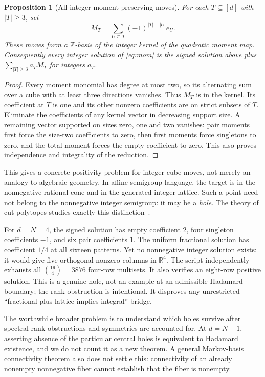 \documentclass[11pt]{article}
\newtheorem{proposition}{Proposition}[section]
\newcommand{\Z}{\mathbb Z}
\newcommand{\R}{\mathbb R}
\begin{document}
\begin{proposition}[All integer moment-preserving moves]\label{prop:moves}
For each $T\subseteq[d]$ with $|T|\ge3$, set
\[
 M_T=\sum_{U\subseteq T}(-1)^{|T|-|U|}e_U.
\]
These moves form a $\Z$-basis of the integer kernel of the quadratic
moment map. Consequently every integer solution of \eqref{eq:mom}
is the signed solution above plus $\sum_{|T|\ge3}a_TM_T$ for integers
$a_T$.
\end{proposition}
\begin{proof}
Every moment monomial has degree at most two, so its alternating sum
over a cube with at least three directions vanishes. Thus $M_T$ is in
the kernel. Its coefficient at $T$ is one and its other nonzero
coefficients are on strict subsets of $T$. Eliminate the coefficients
of any kernel vector in decreasing support size. A remaining vector
supported on sizes zero, one and two vanishes: pair moments first force
the size-two coefficients to zero, then first moments force singletons
to zero, and the total moment forces the empty coefficient to zero.
This also proves independence and integrality of the reduction.
\end{proof}

This gives a concrete positivity problem for integer cube moves, not
merely an analogy to algebraic geometry. In affine-semigroup language,
the target is in the nonnegative rational cone and in the generated
integer lattice. Such a point need not belong to the nonnegative
integer semigroup: it may be a \emph{hole}. The theory of cut polytopes
studies exactly this distinction~\cite{Ohsugi}.

For $d=N=4$, the signed solution has empty coefficient $2$, four
singleton coefficients $-1$, and six pair coefficients $1$. The
uniform fractional solution has coefficient $1/4$ at all sixteen
patterns. Yet no nonnegative integer solution exists: it would give
five orthogonal nonzero columns in $\R^4$. The script independently
exhausts all $\binom{19}{4}=3876$ four-row multisets. It also verifies
an eight-row positive solution. This is a genuine hole, not an example
at an admissible Hadamard boundary; the rank obstruction is intentional.
It disproves any unrestricted ``fractional plus lattice implies
integral'' bridge.

The worthwhile broader problem is to understand which holes survive
after spectral rank obstructions and symmetries are accounted for.
At $d=N-1$, asserting absence of the particular central holes is
equivalent to Hadamard existence, and we do not count it as a new theorem.
A general Markov-basis connectivity theorem also does not settle this:
connectivity of an already nonempty nonnegative fiber cannot establish
that the fiber is nonempty.
\end{document}
